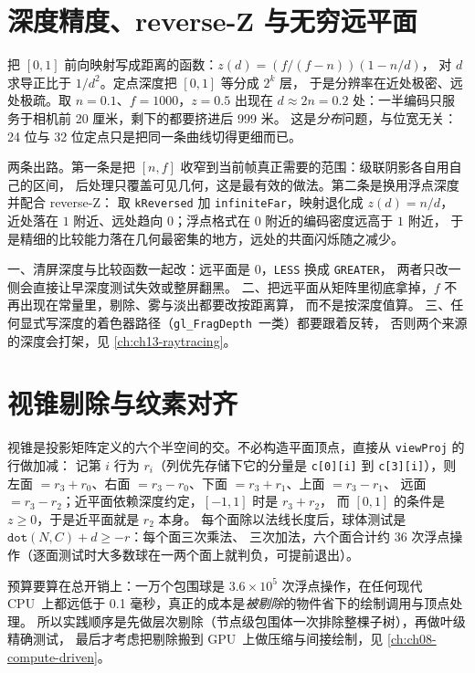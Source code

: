 \documentclass[12pt,a4paper,fontset=fandol]{ctexbook}
\newcommand{\Tp}[1]{\texttt{#1}}
\newcommand{\Lang}[1]{\textsf{#1}}
\newcommand{\DomCPU}{\Lang{CPU}}
\newcommand{\DomGPU}{\Lang{GPU}}
\begin{document}
\section{深度精度、reverse-Z 与无穷远平面}

把 $[0,1]$ 前向映射写成距离的函数：$z(d) = (f/(f - n))(1 - n/d)$，
对 $d$ 求导正比于 $1/d^{2}$。定点深度把 $[0,1]$ 等分成 $2^{k}$ 层，
于是分辨率在近处极密、远处极疏。取 $n = 0.1$、$f = 1000$，$z = 0.5$ 出现在
$d \approx 2n = 0.2$ 处：一半编码只服务于相机前 20 厘米，剩下的都要挤进后 999 米。
这是\emph{分布}问题，与位宽无关：24 位与 32 位定点只是把同一条曲线切得更细而已。

两条出路。第一条是把 $[n, f]$ 收窄到当前帧真正需要的范围：级联阴影各自用自己的区间，
后处理只覆盖可见几何，这是最有效的做法。第二条是换用浮点深度并配合 reverse-Z：
取 \Tp{kReversed} 加 \Tp{infiniteFar}，映射退化成 $z(d) = n/d$，
近处落在 $1$ 附近、远处趋向 $0$；浮点格式在 $0$ 附近的编码密度远高于 $1$ 附近，
于是精细的比较能力落在几何最密集的地方，远处的共面闪烁随之减少。

\begin{bestpractice}[title={reverse-Z 的三件配套工作}]
  一、清屏深度与比较函数一起改：远平面是 $0$，\Tp{LESS} 换成 \Tp{GREATER}，
  两者只改一侧会直接让早深度测试失效或整屏翻黑。
  二、把远平面从矩阵里彻底拿掉，$f$ 不再出现在常量里，剔除、雾与淡出都要改按距离算，
  而不是按深度值算。
  三、任何显式写深度的着色器路径（\Tp{gl\_FragDepth}\ 一类）都要跟着反转，
  否则两个来源的深度会打架，见 \ref{ch:ch13-raytracing}。
\end{bestpractice}

\section{视锥剔除与纹素对齐}
\label{sec:ch04-cull}

视锥是投影矩阵定义的六个半空间的交。不必构造平面顶点，直接从 \Tp{viewProj} 的行做加减：
记第 $i$ 行为 $r_i$（列优先存储下它的分量是 \Tp{c[0][i]} 到 \Tp{c[3][i]}），则
左面 $= r_3 + r_0$、右面 $= r_3 - r_0$、下面 $= r_3 + r_1$、上面 $= r_3 - r_1$、
远面 $= r_3 - r_2$；近平面依赖深度约定，$[-1,1]$ 时是 $r_3 + r_2$，
而 $[0,1]$ 的条件是 $z \ge 0$，于是近平面就是 $r_2$ 本身。
每个面除以法线长度后，球体测试是 $\Tp{dot}(N, C) + d \ge -r$：每个面三次乘法、
三次加法，六个面合计约 $36$ 次浮点操作（逐面测试时大多数球在一两个面上就判负，可提前退出）。

预算要算在总开销上：一万个包围球是 $3.6 \times 10^{5}$ 次浮点操作，在任何现代 \DomCPU\
上都远低于 0.1 毫秒，真正的成本是\emph{被剔除}的物件省下的绘制调用与顶点处理。
所以实践顺序是先做层次剔除（节点级包围体一次排除整棵子树），再做叶级精确测试，
最后才考虑把剔除搬到 \DomGPU\ 上做压缩与间接绘制，见 \ref{ch:ch08-compute-driven}。
\end{document}
